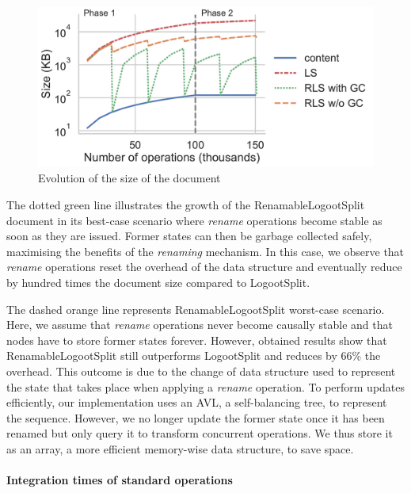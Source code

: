 \documentclass[sigplan,10pt,authorversion]{acmart}
\begin{document}
\begin{figure}[ht!]
    \centering
    \includegraphics[width=\columnwidth]{img/snapshots-sizes.pdf}
    \caption{Evolution of the size of the document}
    \label{fig:evolution-document-size}
\end{figure}

\begin{sloppypar}
The dotted green line illustrates the growth of the RenamableLogootSplit document in its best-case scenario where \emph{rename} operations become stable as soon as they are issued.
Former states can then be garbage collected safely, maximising the benefits of the \emph{renaming} mechanism.
In this case, we observe that \emph{rename} operations reset the overhead of the data structure and eventually reduce by hundred times the document size compared to LogootSplit.
\end{sloppypar}

The dashed orange line represents RenamableLogootSplit worst-case scenario.
Here, we assume that \emph{rename} operations never become causally stable and that nodes have to store former states forever.
However, obtained results show that RenamableLogootSplit still outperforms LogootSplit and reduces by 66\% the overhead.
This outcome is due to the change of data structure used to represent the state that takes place when applying a \emph{rename} operation.
To perform updates efficiently, our implementation uses an AVL, a self-balancing tree, to represent the sequence.
However, we no longer update the former state once it has been renamed but only query it to transform concurrent operations.
We thus store it as an array, a more efficient memory-wise data structure, to save space.

\paragraph{Integration times of standard operations}
\end{document}

